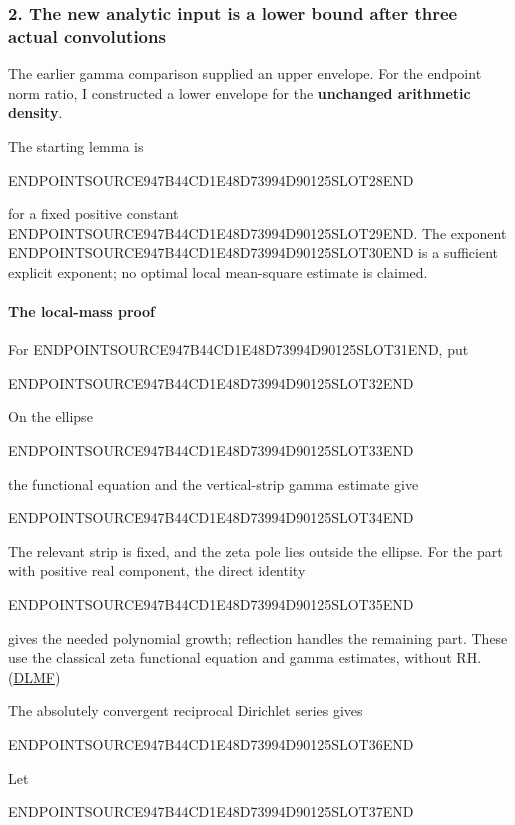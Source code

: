 \subsubsection{2. The new analytic input is a lower bound after three actual convolutions}\label{endpoint-user_norm_original--the-new-analytic-input-is-a-lower-bound-after-three-actual-convolutions}

The earlier gamma comparison supplied an upper envelope. For the endpoint norm ratio, I constructed a lower envelope for the \textbf{unchanged arithmetic density}.

The starting lemma is

ENDPOINTSOURCE947B44CD1E48D73994D90125SLOT28END

for a fixed positive constant ENDPOINTSOURCE947B44CD1E48D73994D90125SLOT29END. The exponent ENDPOINTSOURCE947B44CD1E48D73994D90125SLOT30END is a sufficient explicit exponent; no optimal local mean-square estimate is claimed.

\paragraph{The local-mass proof}\label{endpoint-user_norm_original--the-local-mass-proof}

For ENDPOINTSOURCE947B44CD1E48D73994D90125SLOT31END, put

ENDPOINTSOURCE947B44CD1E48D73994D90125SLOT32END

On the ellipse

ENDPOINTSOURCE947B44CD1E48D73994D90125SLOT33END

the functional equation and the vertical-strip gamma estimate give

ENDPOINTSOURCE947B44CD1E48D73994D90125SLOT34END

The relevant strip is fixed, and the zeta pole lies outside the ellipse. For the part with positive real component, the direct identity

ENDPOINTSOURCE947B44CD1E48D73994D90125SLOT35END

gives the needed polynomial growth; reflection handles the remaining part. These use the classical zeta functional equation and gamma estimates, without RH. (\href{https://dlmf.nist.gov/25.4}{DLMF})

The absolutely convergent reciprocal Dirichlet series gives

ENDPOINTSOURCE947B44CD1E48D73994D90125SLOT36END

Let

ENDPOINTSOURCE947B44CD1E48D73994D90125SLOT37END

